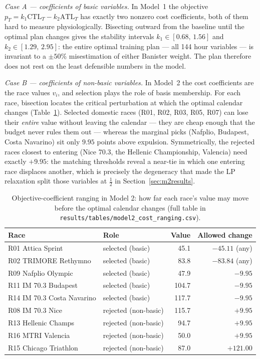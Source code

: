 \documentclass[11pt,a4paper]{article}
\begin{document}
\emph{Case A --- coefficients of basic variables.} In Model~1 the objective
$p_T = k_1 \text{CTL}_T - k_2 \text{ATL}_T$ has exactly two nonzero cost
coefficients, both of them hard to measure physiologically. Bisecting outward
from the baseline until the optimal plan changes gives the stability intervals
$k_1 \in [0.68,\, 1.56]$ and $k_2 \in [1.29,\, 2.95]$: the entire optimal
training plan --- all 144 hour variables --- is invariant to a $\pm 50\%$
misestimation of either Banister weight. The plan therefore does not rest on
the least defensible numbers in the model.

\emph{Case B --- coefficients of non-basic variables.} In Model~2 the cost
coefficients are the race values $v_i$, and selection plays the role of basis
membership. For each race, bisection locates the critical perturbation at which
the optimal calendar changes (Table~\ref{tab:costrange}). Selected domestic
races (R01, R02, R03, R05, R07) can lose their \emph{entire} value without
leaving the calendar --- they are cheap enough that the budget never rules them
out --- whereas the marginal picks (Nafplio, Budapest, Costa Navarino) sit only
$9.95$ points above expulsion. Symmetrically, the rejected races closest to
entering (Nice 70.3, the Hellenic Championship, Valencia) need exactly $+9.95$:
the matching thresholds reveal a near-tie in which one entering race displaces
another, which is precisely the degeneracy that made the LP relaxation split
those variables at $\tfrac12$ in Section~\ref{sec:m2results}.

\begin{table}[h]
\centering\small
\begin{tabular}{llrr}
\toprule
Race & Role & Value & Allowed change\\
\midrule
R01 Attica Sprint & selected (basic) & 45.1 & $-45.11$ (any)\\
R02 TRIMORE Rethymno & selected (basic) & 83.8 & $-83.84$ (any)\\
R09 Nafplio Olympic & selected (basic) & 47.9 & $-9.95$\\
R11 IM 70.3 Budapest & selected (basic) & 104.7 & $-9.95$\\
R14 IM 70.3 Costa Navarino & selected (basic) & 117.7 & $-9.95$\\
\midrule
R08 IM 70.3 Nice & rejected (non-basic) & 115.7 & $+9.95$\\
R13 Hellenic Champs & rejected (non-basic) & 94.7 & $+9.95$\\
R16 MTRI Valencia & rejected (non-basic) & 50.0 & $+9.95$\\
R15 Chicago Triathlon & rejected (non-basic) & 87.0 & $+121.00$\\
\bottomrule
\end{tabular}
\caption{Objective-coefficient ranging in Model 2: how far each race's value
may move before the optimal calendar changes (full table in
\texttt{results/tables/model2\_cost\_ranging.csv}).}
\label{tab:costrange}
\end{table}
\end{document}
